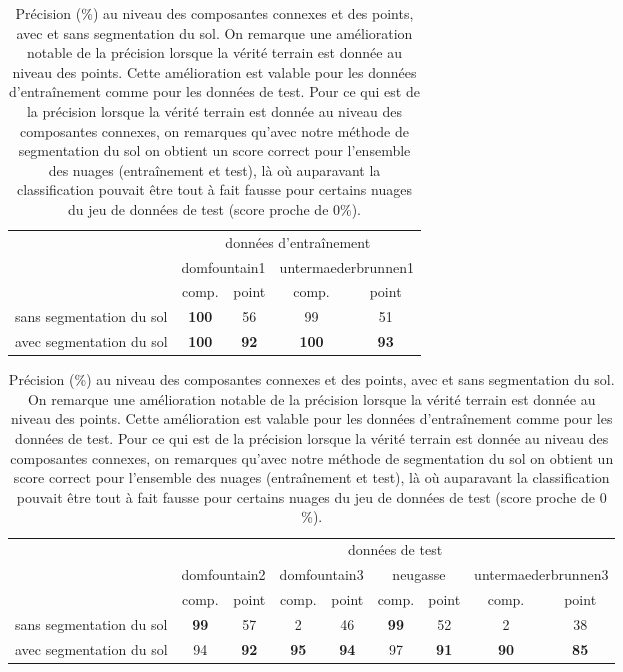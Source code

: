 \documentclass[a4paper, onecolumn, 11pt]{article}
\begin{document}
\begin{table}[p]
\caption{Précision (\%) au niveau des composantes connexes et des points, avec et sans segmentation du sol. On remarque une amélioration notable de la précision lorsque la vérité terrain est donnée au niveau des points. Cette amélioration est valable pour les données d'entraînement comme pour les données de test. Pour ce qui est de la précision lorsque la vérité terrain est donnée au niveau des composantes connexes, on remarques qu'avec notre méthode de segmentation du sol on obtient un score correct pour l'ensemble des nuages (entraînement et test), là où auparavant la classification pouvait être tout à fait fausse pour certains nuages du jeu de données de test (score proche de $0$\%).}

\begin{tabular}{l|c|c|c|c|}
\cline{2-5}
 & \multicolumn{4}{c|}{données d'entraînement} \\ 
\cline{2-5} 
 & \multicolumn{2}{c|}{domfountain1} & \multicolumn{2}{c|}{untermaederbrunnen1} \\
\cline{2-5} 
 & comp. & point & comp. & point \\
\hline
\multicolumn{1}{|l|}{sans segmentation du sol} & \textbf{100} & 56 & 99 & 51 \\
\hline
\multicolumn{1}{|l|}{avec segmentation du sol} & \textbf{100} & \textbf{92} & \textbf{100} & \textbf{93}\\
\hline
\end{tabular}

\bigskip

\begin{tabular}{l|c|c|c|c|c|c|c|c|}
\cline{2-9}
 & \multicolumn{8}{c|}{données de test}\\ 
\cline{2-9}
 & \multicolumn{2}{c|}{domfountain2} & \multicolumn{2}{c|}{domfountain3} & \multicolumn{2}{c|}{neugasse} & \multicolumn{2}{c|}{untermaederbrunnen3} \\ 
\cline{2-9}
& comp. & point & comp. & point & comp. & point & comp. & point\\
\hline
\multicolumn{1}{|l|}{sans segmentation du sol} & \textbf{99} & 57 & 2 & 46 & \textbf{99} & 52 & 2 & 38 \\
\hline
\multicolumn{1}{|l|}{avec segmentation du sol} & 94 & \textbf{92} & \textbf{95} & \textbf{94} & 97 & \textbf{91} & \textbf{90} & \textbf{85}\\
\hline
\end{tabular}
\label{table:ground}
\end{table}
\end{document}
